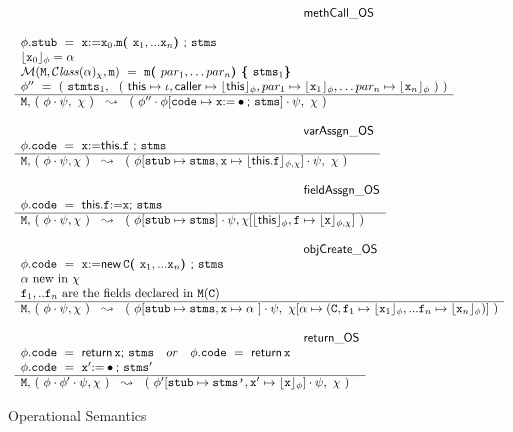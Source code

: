 \begin{figure*}
$\begin{array}{l}
\inferenceruleNN {methCall\_OS} { 
\\
\phi.\prg{stub}\ =\ \x {\kw{:= }} \x_0.\m \lp \x_1, ... \x_n \rp \semi \prg{stms}
\\ 
\interp{\x_0}{\phi} = \alpha 
\\
\Meths {} {\ClassOf {\alpha} {\chi}} {\m} \  =  \ \m\lp par_1, \ldots par_n \rp \lb \prg{stms}_1   \rb
  \\
 \phi''\ =\  (\  \prg{stmts}_1,\ \ (\ \this \mapsto \iota, \caller \mapsto  \interp{\this}{\phi}, par_1 \mapsto  \interp{\x_1}{\phi}, \ldots par_n \mapsto  \interp{\x_n}{\phi}\ ) \ )
}
{
 \M,\, (\ \phi\cdot\psi,\ \chi\ )\ \ \leadsto\  \ (\ \phi''\cdot\phi[\prg{code}\mapsto\x  \kw{:=} \bullet \semi \prg{stms}] \cdot\psi,\ \chi\ ) 
}

\\ \\
\inferenceruleNN {varAssgn\_OS} {
 \phi.\prg{code} \ = \ \x  {\kw{:= }}   \this.\f \ \semi \prg{stms}
}
{
 \M,\,  (\ \phi\cdot\psi, \chi\ )\ \ \leadsto\  \ (\ \phi[ \prg{stub} \mapsto \prg{stms}, \x\mapsto \interp{\this.\f}{\phi,\chi}] \cdot\psi,\ \chi\  )
}
\\
\\
\inferenceruleNN{fieldAssgn\_OS} {
 \phi.\prg{code}\ =\  \this.\f  \kw{:=} \x  \semi \prg{stms}
}
{
 \M,\,  (\ \phi\cdot\psi, \chi\  )\ \ \leadsto\  \ (\ \phi[\prg{stub}\mapsto  \prg{stms} ] \cdot\psi, \chi[\interp{\this}{\phi},\f \mapsto \interp{\x}{\phi,\chi}]\  ) 
}
\\
\\
\inferenceruleNN {objCreate\_OS} {
 \phi.\prg{code}\ =\  \x  \kw{:=} \kw{new }\, \c \lp \x_1, ... \x_n \rp  \semi \prg{stms}
 \\
 \alpha\ \mbox{new in}\ \chi
 \\
\f_1, .. \f_n\ \mbox{are the fields declared in } \M(\c)
}
{
 \M,\,  (\ \phi\cdot\psi, \chi\ )\ \ \leadsto\  \ (\ \phi[\prg{stub}\mapsto  \prg{stms},\x \mapsto \alpha\ ] \cdot\psi, \ \chi[\alpha \mapsto (\c,\f_1 \mapsto \interp{\x_1}{\phi},  ... \f_n \mapsto \interp{\x_n}{\phi}  ) ]\ ) 
}
\\
\\
\inferenceruleNN {return\_OS} {
 \phi.\prg{code}\ =\   {\kw {return }}\, \x  \semi \prg{stms}\ \  \ or\  \ \  \phi.\prg{code}\ =\   {\kw{return}}\, \x 
 \\
\phi.\prg{code}\ =\  \x' \kw{:=} \bullet  \semi \prg{stms}'
}
{
 \M,\,  (\ \phi\cdot\phi'\cdot\psi, \chi\ )\ \ \leadsto\  \ (\ \phi'[\prg{stub}\mapsto  \prg{stms'},\x' \mapsto \interp{\x}{\phi}] \cdot\psi, \ \chi \ ) 
}
\end{array}
$
\caption{Operational Semantics}
\label{fig:Execution}
\end{figure*}



